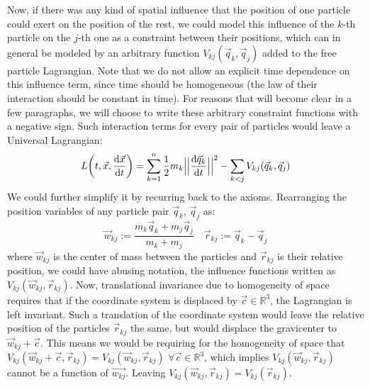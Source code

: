 \documentclass[11pt, a4paper]{article} %
\newcommand{\R}{\mathbb{R}} %
\begin{document}
Now, if there was any kind of spatial influence that the position of one particle could exert on the position of the rest, we could model this influence of the $k$-th particle on the $j$-th one as a constraint between their positions, which can in general be modeled by an arbitrary function $V_{kj}(\vec{q}_k, \vec{q}_j)$ added to the free particle Lagrangian. Note that we do not allow an explicit time dependence on this influence term, since time should be homogeneous (the law of their interaction should be constant in time). For reasons that will become clear in a few paragraphs, we will choose to write these arbitrary constraint functions with a negative sign. Such interaction terms for every pair of particles would leave a Universal Lagrangian:
\begin{equation}
L\qty(t, \vec{x}, \dv{\vec{x}}{t})=\sum_{k=1}^n\frac{1}{2}m_k\Big|\Big|\dv{\vec{q}_k}{t}\Big|\Big|^2-\sum_{k<j}V_{kj}(\vec{q}_k, \vec{q}_j)
\end{equation}
We could further simplify it by recurring back to the axioms. Rearranging the position variables of any particle pair $\vec{q}_k$, $\vec{q}_j$ as:
\begin{equation}
\vec{w}_{kj}:=\frac{m_k\vec{q}_k+m_j\vec{q}_j}{m_k+m_j} \quad \vec{r}_{kj}:=\vec{q}_k-\vec{q}_j
\end{equation}
where $\vec{w}_{kj}$ is the center of mass between the particles and $\vec{r}_{kj}$ is their relative position, we could have abusing notation, the influence functions written as $V_{kj}(\vec{w}_{kj}, \vec{r}_{kj})$. Now, translational invariance due to homogeneity of space requires that if the coordinate system is displaced by $\vec{c}\in\R^3$, the Lagrangian is left invariant. Such a translation of the coordinate system would leave the relative position of the particles $\vec{r}_{kj}$ the same, but would displace the gravicenter to $\vec{w}_{kj}+\vec{c}$. This means we would be requiring for the homogeneity of space that $V_{kj}(\vec{w}_{kj}+\vec{c},\vec{r}_{kj})=V_{kj}(\vec{w}_{kj},\vec{r}_{kj})$ $\forall \vec{c}\in\R^3$, which implies $V_{kj}(\vec{w}_{kj},\vec{r}_{kj})$ cannot be a function of $\vec{w_{kj}}$. Leaving $V_{kj}(\vec{w}_{kj},\vec{r}_{kj})=V_{kj}(\vec{r}_{kj})$.
\end{document}
